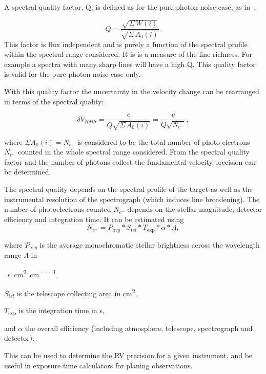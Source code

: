 A spectral quality factor, Q, is defined as for the pure photon noise case, as in~\cite{connes_absolute_1985, connes_demonstration_1996}.

\begin{equation}
Q = \frac{\sqrt{\Sigma{\,W(i)}}}{\sqrt{\Sigma{\,A_0(i)}}}.
\end{equation}
This factor is flux independent and is purely a function of the spectral profile within the spectral range considered. It is is a measure of the line richness. For example a spectra with many sharp lines will have a high Q. This quality factor is valid for the pure photon noise case only.

With this quality factor the uncertainty in the velocity change can be rearranged in terms of the spectral quality;

\begin{equation}
    \delta V_{RMS} = \frac{c}{Q \sqrt{\Sigma {\,A_0(i)}}} = \frac{c}{Q \sqrt{{N}_{{e}^{-}}}},
\end{equation}

where \(\Sigma A_0(i) = {N}_{{e}^{-}}\) is considered to be the total number of photo electrons \({N}_{{e}^{-}}\) counted in the whole spectral range considered.
From the spectral quality factor and the number of photons collect the fundamental velocity precision can be determined.

The spectral quality depends on the spectral profile of the target as well as the instrumental resolution of the spectrograph (which induces line broadening). The number of photoelectrons counted  \(N_{e^{-}}\) depends on the stellar magnitude, detector efficiency and integration time. It can be estimated using
 \begin{equation}
 N_{e^{-}} = P_{avg} * S_{tel} * T_{\textrm{exp}} * \alpha* \Lambda,
 \end{equation}

where \(P_{avg}\) is the average monochromatic stellar brightness
across the wavelength range \(\Lambda\) in

\si{\photons\per\second\per\centi\metre\squared\per\centi\metre},

\(S_{tel}\) is the telescope collecting area in \si{\centi\metre\squared},

\(T_{\textrm{exp}}\) is the integration time in \si{\second},

and \(\alpha\) the overall efficiency (including atmosphere, telescope, spectrograph and detector).

 This can be used to determine the {RV} precision for a given instrument, and be useful in exposure time calculators for planing observations.


